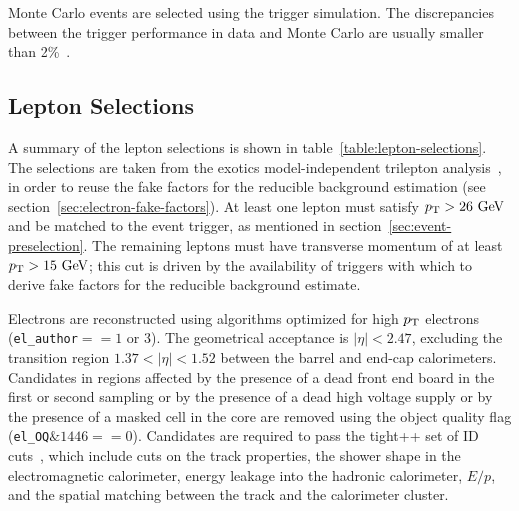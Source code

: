Monte Carlo events are selected using the trigger simulation. The discrepancies between the trigger performance in data and Monte Carlo are usually smaller than 2\%~\cite{Ancu:1501709}. 

\subsection{Lepton Selections}\label{sec:lepton-selections}
A summary of the lepton selections is shown in table~\ref{table:lepton-selections}. The selections are taken from the exotics model-independent trilepton analysis~\cite{DeViveiros:1670929}, in order to reuse the fake factors for the reducible background estimation (see section~\ref{sec:electron-fake-factors}). At least one lepton must satisfy $p_{\text{T}}>26~\mbox{GeV}$ and be matched to the event trigger, as mentioned in section~\ref{sec:event-preselection}. The remaining leptons must have transverse momentum of at least $p_{\text{T}}>15~\mbox{GeV}$; this cut is driven by the availability of triggers with which to derive fake factors for the reducible background estimate. 

Electrons are reconstructed using algorithms optimized for high $p_{\text{T}}$ electrons (\verb.el_author.$==1$ or $3$). The geometrical acceptance is $|\eta|<2.47$, excluding the transition region $1.37<|\eta|<1.52$ between the barrel and end-cap calorimeters. Candidates in regions affected by the presence of a dead front end board in the first or second sampling or by the presence of a dead high voltage supply or by the presence of a masked cell in the core are removed using the object quality flag (\verb.el_OQ.$\&1446==0$). Candidates are required to pass the tight++ set of ID cuts~\cite{Aad:2014fxa}, which include cuts on the track properties, the shower shape in the electromagnetic calorimeter, energy leakage into the hadronic calorimeter, $E/p$, and the spatial matching between the track and the calorimeter cluster. 

